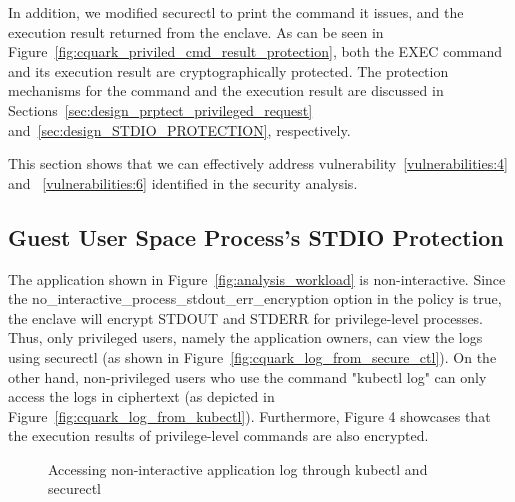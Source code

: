 In addition, we modified securectl to print the command it issues, and the execution result returned from the enclave. As can be seen in Figure~\ref{fig:cquark_priviled_cmd_result_protection}, both the EXEC command and its execution result are cryptographically protected. The protection mechanisms for the command and the execution result are 
discussed in Sections~\ref{sec:design_prptect_privileged_request} and~\ref{sec:design_STDIO_PROTECTION}, respectively.


This section shows that we can effectively address vulnerability~\ref{vulnerabilities:4} and ~\ref{vulnerabilities:6} identified in the security analysis.



\subsection{Guest User Space Process's STDIO Protection}
The application shown in Figure~\ref{fig:analysis_workload} is non-interactive. Since the no\_interactive\_process\_stdout\_err\_encryption option in the policy is true, the enclave will encrypt STDOUT and STDERR for privilege-level processes. Thus, only privileged users, namely the application owners, can view the logs using securectl (as shown in Figure~\ref{fig:cquark_log_from_secure_ctl}). On the other hand, non-privileged users who use the command 
"kubectl log" can only access the logs in ciphertext (as depicted in Figure~\ref{fig:cquark_log_from_kubectl}). Furthermore, Figure 4 showcases that the execution results of privilege-level commands are also encrypted.

\begin{figure}[!htb]

    
    
    \caption[Accessing non-interactive application log through kubectl and securectl]{Accessing non-interactive application log through kubectl and securectl}
\end{figure}

